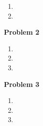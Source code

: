 \documentclass[12pt]{article}
\newcommand{\probnum}[1]
{\large {\bf Problem {#1}}}
\begin{document}
\begin{enumerate}
\item

\item

\end{enumerate}

\probnum{2}

\begin{enumerate}

\item

\item

\item

\end{enumerate}

\probnum{3}

\begin{enumerate}

\item

\item

\item

\end{enumerate}
\end{document}
